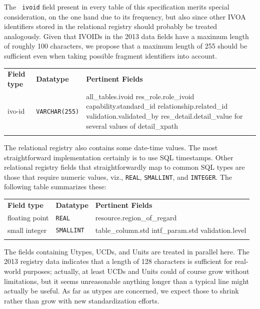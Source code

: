 \documentclass[11pt,a4paper]{ivoa}
\newcommand{\rtent}[1]{\texttt{\color{rtcolor} #1}}
\begin{document}
The \rtent{ivoid} field present in every table of this
specification merits special consideration, on the one hand due to its
frequency, but also since other IVOA identifiers stored in the
relational registry should probably be treated analogously.
Given that IVOIDs in the 2013 data fields have a maximum
length of roughly 100 characters, we propose that a maximum length of 
255 should be sufficient even when taking possible fragment identifiers
into account.

\begin{inlinetable}
\begin{tabular}{llp{6cm}}
\sptablerule
\textbf{Field type}&
\textbf{Datatype}&
\textbf{Pertinent Fields}\\
\sptablerule
ivo-id&\texttt{VARCHAR(255)}&
          {all\_tables}.ivoid\hfil\break
          res\_role.role\_ivoid\hfil\break
          capability.standard\_id\hfil\break
          relationship.related\_id\hfil\break
          validation.validated\_by\hfil\break
          res\_detail.detail\_value for several values of detail\_xpath\\
\sptablerule
\end{tabular}
\end{inlinetable}

The relational registry also contains some date-time values. The most
straightforward implementation certainly is to use SQL timestamps.
Other relational registry fields that straightforwardly map to common
SQL types are those that require numeric values, viz.,
\texttt{REAL}, \texttt{SMALLINT}, and
\texttt{INTEGER}.  The following table summarizes these:


\begin{inlinetable}
\begin{tabular}{llp{6cm}}
\sptablerule
\textbf{Field type}&
\textbf{Datatype}&
\textbf{Pertinent Fields}\\
\sptablerule
floating point&\texttt{REAL}&resource.region\_of\_regard\\
\sptablerule
small integer&\texttt{SMALLINT}&table\_column.std\hfil\break
          intf\_param.std\hfil\break
          validation.level\\
\sptablerule
\end{tabular}
\end{inlinetable}

The fields containing Utypes, UCDs, and Units are treated in parallel
here. The 2013 registry data indicates that a length of 128 characters is
sufficient for real-world purposes; actually, at least UCDs and Units
could of course grow without limitations, but it seems unreasonable
anything longer than a typical line might actually be useful.  As far as
utypes are concerned, we expect those to shrink rather than grow with
new standardization efforts.
\end{document}
